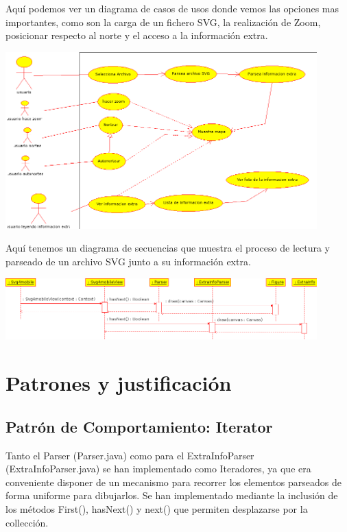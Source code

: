 \documentclass[a4paper,10pt]{article}
\begin{document}
Aquí podemos ver un diagrama de casos de usos donde vemos las opciones mas importantes, como son la carga de un fichero SVG,  la realización de Zoom, posicionar respecto al norte y el acceso a la información extra.

\begin{center}
 \includegraphics[width=12cm]{caso_de_uso.png}
\end{center}

Aquí tenemos un diagrama de secuencias que muestra el proceso de lectura y parseado de un archivo SVG junto a su información extra.

\begin{center}
 \includegraphics[width=12cm]{secuencia.png}
\end{center}

\section{Patrones y justificación}
\subsection{Patrón de Comportamiento: Iterator}

Tanto el Parser (Parser.java) como para el ExtraInfoParser (ExtraInfoParser.java) se han implementado como Iteradores, ya que era conveniente disponer de un mecanismo para recorrer los elementos parseados de forma uniforme para dibujarlos. Se han implementado mediante la inclusión de los métodos First(), hasNext() y next() que permiten desplazarse por la collección.
\end{document}
